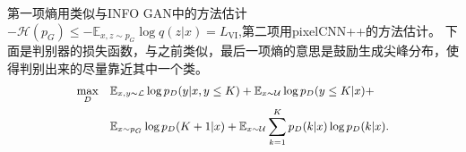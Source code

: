 \documentclass[a4paper]{article}
\begin{document}
第一项熵用类似与INFO GAN中的方法估计$-\mathcal{H}(p_G) \leq - \mathbb{E}_{x, z \sim p_G} \log q(z | x) = L_\text{VI}$,第二项用pixelCNN++\cite{DBLP:journals/corr/SalimansKCK17}的方法估计。
下面是判别器的损失函数，与之前类似，最后一项熵的意思是鼓励生成尖峰分布，使得判别出来的尽量靠近其中一个类。
\begin{equation}
\small
\begin{aligned}
\max_{D} \quad
& \mathbb{E}_{x, y \sim \mathcal{L}} \log p_D(y | x, y \leq K) + \mathbb{E}_{x \sim \mathcal{U}} \log p_D(y \leq K | x) + \\
& \mathbb{E}_{x \sim p_G} \log p_D(K + 1 | x)  + \mathbb{E}_{x \sim \mathcal{U}} \sum_{k = 1}^K p_D(k | x) \log p_D(k | x).
\label{eq:d_full}
\end{aligned}
\end{equation}


\end{document}
